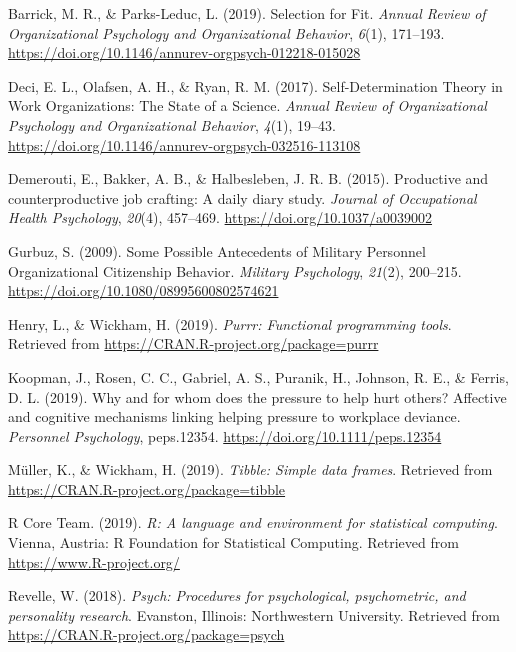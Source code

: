 \documentclass[english,man]{apa6}
\begin{document}
\leavevmode\hypertarget{ref-barrickSelectionFit2019a}{}%
Barrick, M. R., \& Parks-Leduc, L. (2019). Selection for Fit. \emph{Annual Review of Organizational Psychology and Organizational Behavior}, \emph{6}(1), 171--193. \url{https://doi.org/10.1146/annurev-orgpsych-012218-015028}

\leavevmode\hypertarget{ref-deciSelfDeterminationTheoryWork2017}{}%
Deci, E. L., Olafsen, A. H., \& Ryan, R. M. (2017). Self-Determination Theory in Work Organizations: The State of a Science. \emph{Annual Review of Organizational Psychology and Organizational Behavior}, \emph{4}(1), 19--43. \url{https://doi.org/10.1146/annurev-orgpsych-032516-113108}

\leavevmode\hypertarget{ref-demeroutiProductiveCounterproductiveJob2015}{}%
Demerouti, E., Bakker, A. B., \& Halbesleben, J. R. B. (2015). Productive and counterproductive job crafting: A daily diary study. \emph{Journal of Occupational Health Psychology}, \emph{20}(4), 457--469. \url{https://doi.org/10.1037/a0039002}

\leavevmode\hypertarget{ref-gurbuzPossibleAntecedentsMilitary2009a}{}%
Gurbuz, S. (2009). Some Possible Antecedents of Military Personnel Organizational Citizenship Behavior. \emph{Military Psychology}, \emph{21}(2), 200--215. \url{https://doi.org/10.1080/08995600802574621}

\leavevmode\hypertarget{ref-R-purrr}{}%
Henry, L., \& Wickham, H. (2019). \emph{Purrr: Functional programming tools}. Retrieved from \url{https://CRAN.R-project.org/package=purrr}

\leavevmode\hypertarget{ref-koopmanWhyWhomDoes2019}{}%
Koopman, J., Rosen, C. C., Gabriel, A. S., Puranik, H., Johnson, R. E., \& Ferris, D. L. (2019). Why and for whom does the pressure to help hurt others? Affective and cognitive mechanisms linking helping pressure to workplace deviance. \emph{Personnel Psychology}, peps.12354. \url{https://doi.org/10.1111/peps.12354}

\leavevmode\hypertarget{ref-R-tibble}{}%
Müller, K., \& Wickham, H. (2019). \emph{Tibble: Simple data frames}. Retrieved from \url{https://CRAN.R-project.org/package=tibble}

\leavevmode\hypertarget{ref-R-base}{}%
R Core Team. (2019). \emph{R: A language and environment for statistical computing}. Vienna, Austria: R Foundation for Statistical Computing. Retrieved from \url{https://www.R-project.org/}

\leavevmode\hypertarget{ref-R-psych}{}%
Revelle, W. (2018). \emph{Psych: Procedures for psychological, psychometric, and personality research}. Evanston, Illinois: Northwestern University. Retrieved from \url{https://CRAN.R-project.org/package=psych}
\end{document}
